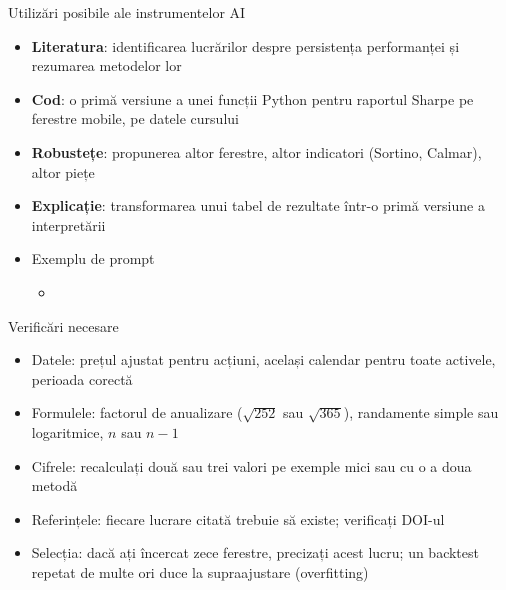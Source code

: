 \begin{frame}{Utilizări posibile ale instrumentelor AI}
\itemsize{\small}
\begin{itemize}
    \item \textbf{Literatura}: identificarea lucrărilor despre persistența performanței și rezumarea metodelor lor
    \item \textbf{Cod}: o primă versiune a unei funcții Python pentru raportul Sharpe pe ferestre mobile, pe datele cursului
    \item \textbf{Robustețe}: propunerea altor ferestre, altor indicatori (Sortino, Calmar), altor piețe
    \item \textbf{Explicație}: transformarea unui tabel de rezultate într-o primă versiune a interpretării
    \item Exemplu de prompt
    \begin{itemize}
        \item {}
    \end{itemize}
\end{itemize}
\end{frame}

\begin{frame}{Verificări necesare}
\itemsize{\small}
\begin{itemize}
    \item Datele: prețul ajustat pentru acțiuni, același calendar pentru toate activele, perioada corectă
    \item Formulele: factorul de anualizare ($\sqrt{252}$ sau $\sqrt{365}$), randamente simple sau logaritmice, $n$ sau $n - 1$
    \item Cifrele: recalculați două sau trei valori pe exemple mici sau cu o a doua metodă
    \item Referințele: fiecare lucrare citată trebuie să existe; verificați DOI-ul
    \item Selecția: dacă ați încercat zece ferestre, precizați acest lucru; un backtest repetat de multe ori duce la supraajustare (overfitting) 
\end{itemize}
\end{frame}

